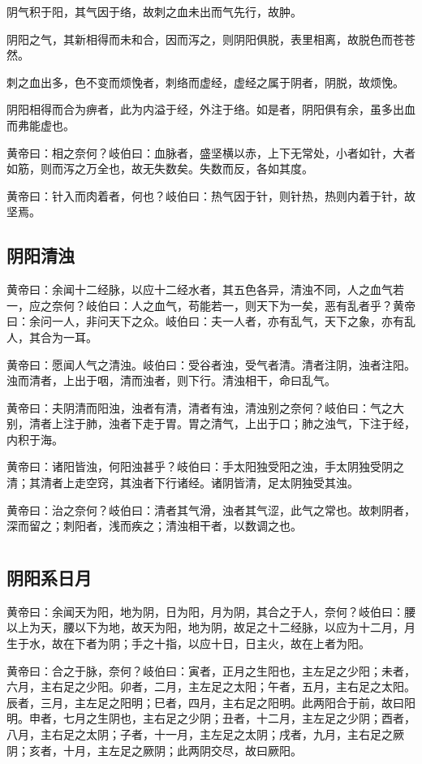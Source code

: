 \documentclass[a4paper,12pt,UTF8,twoside]{ctexbook}
\begin{document}
	阴气积于阳，其气因于络，故刺之血未出而气先行，故肿。
	
	阴阳之气，其新相得而未和合，因而泻之，则阴阳俱脱，表里相离，故脱色而苍苍然。
	
	刺之血出多，色不变而烦悗者，刺络而虚经，虚经之属于阴者，阴脱，故烦悗。
	
	阴阳相得而合为痹者，此为内溢于经，外注于络。如是者，阴阳俱有余，虽多出血而弗能虚也。
	
	黄帝曰：相之奈何？岐伯曰：血脉者，盛坚横以赤，上下无常处，小者如针，大者如筋，则而泻之万全也，故无失数矣。失数而反，各如其度。
	
	黄帝曰：针入而肉着者，何也？岐伯曰：热气因于针，则针热，热则内着于针，故坚焉。
	\chapter{阴阳清浊}
	
	黄帝曰：余闻十二经脉，以应十二经水者，其五色各异，清浊不同，人之血气若一，应之奈何？岐伯曰：人之血气，苟能若一，则天下为一矣，恶有乱者乎？黄帝曰：余问一人，非问天下之众。岐伯曰：夫一人者，亦有乱气，天下之象，亦有乱人，其合为一耳。
	
	黄帝曰：愿闻人气之清浊。岐伯曰：受谷者浊，受气者清。清者注阴，浊者注阳。浊而清者，上出于咽，清而浊者，则下行。清浊相干，命曰乱气。
	
	黄帝曰：夫阴清而阳浊，浊者有清，清者有浊，清浊别之奈何？岐伯曰：气之大别，清者上注于肺，浊者下走于胃。胃之清气，上出于口；肺之浊气，下注于经，内积于海。
	
	黄帝曰：诸阳皆浊，何阳浊甚乎？岐伯曰：手太阳独受阳之浊，手太阴独受阴之清；其清者上走空窍，其浊者下行诸经。诸阴皆清，足太阴独受其浊。
	
	黄帝曰：治之奈何？岐伯曰：清者其气滑，浊者其气涩，此气之常也。故刺阴者，深而留之；刺阳者，浅而疾之；清浊相干者，以数调之也。
	
	\part{}
	\chapter{阴阳系日月}
	
	黄帝曰：余闻天为阳，地为阴，日为阳，月为阴，其合之于人，奈何？岐伯曰：腰以上为天，腰以下为地，故天为阳，地为阴，故足之十二经脉，以应为十二月，月生于水，故在下者为阴；手之十指，以应十日，日主火，故在上者为阳。
	
	黄帝曰：合之于脉，奈何？岐伯曰：寅者，正月之生阳也，主左足之少阳；未者，六月，主右足之少阳。卯者，二月，主左足之太阳；午者，五月，主右足之太阳。辰者，三月，主左足之阳明；巳者，四月，主右足之阳明。此两阳合于前，故曰阳明。申者，七月之生阴也，主右足之少阴；丑者，十二月，主左足之少阴；酉者，八月，主右足之太阴；子者，十一月，主左足之太阴；戌者，九月，主右足之厥阴；亥者，十月，主左足之厥阴；此两阴交尽，故曰厥阳。
	
\end{document}
